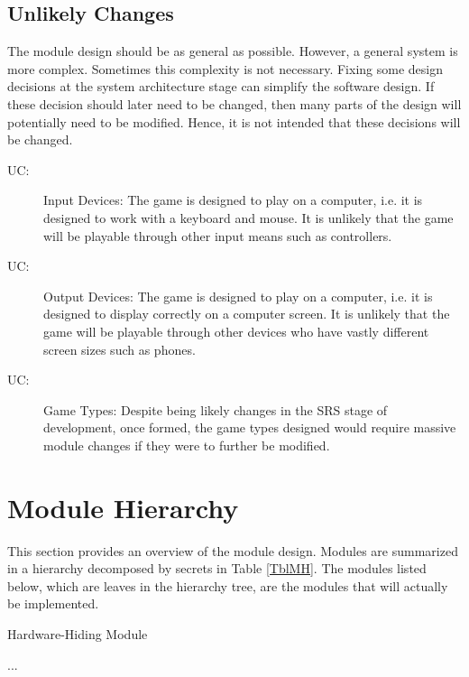 \documentclass[12pt, titlepage]{article}
\newcounter{ucnum}
\newcommand{\uctheucnum}{UC\theucnum}
\newcounter{mnum}
\newcommand{\mthemnum}{M\themnum}
\begin{document}

\subsection{Unlikely Changes} \label{SecUchange}

The module design should be as general as possible. However, a general system is
more complex. Sometimes this complexity is not necessary. Fixing some design
decisions at the system architecture stage can simplify the software design. If
these decision should later need to be changed, then many parts of the design
will potentially need to be modified. Hence, it is not intended that these
decisions will be changed.

\begin{description}
\item[ \uctheucnum \label{ucInput}:] Input Devices: The game is designed to play on a computer, i.e. it is designed to work with a keyboard and mouse. It is unlikely that the game will be playable through other input means such as controllers.
\item[ \uctheucnum \label{ucOutput}:] Output Devices: The game is designed to play on a computer, i.e. it is designed to display correctly on a computer screen. It is unlikely that the game will be playable through other devices who have vastly different screen sizes such as phones.
\item[ \uctheucnum \label{ucGames}:] Game Types: Despite being likely changes in the SRS stage of development, once formed, the game types designed would require massive module changes if they were to further be modified.
\end{description}

\newpage
\section{Module Hierarchy} \label{SecMH}

This section provides an overview of the module design. Modules are summarized
in a hierarchy decomposed by secrets in Table \ref{TblMH}. The modules listed
below, which are leaves in the hierarchy tree, are the modules that will
actually be implemented.

\begin{description}
\item [ \mthemnum \label{mHH}:] Hardware-Hiding Module
\item ...
\end{description}
\end{document}
